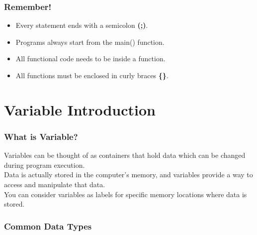 \documentclass[xcolor=dvipsnames]{beamer}
\begin{document}
    \begin{frame}
        \frametitle{Remember!}
        \begin{itemize}
            \item Every statement ends with a semicolon \textbf{(;)}.
            \item Programs always start from the \alert{main()} function.
            \item All functional code needs to be inside a function.
            \item All functions must be enclosed in curly braces \textbf{\{\}}.
        \end{itemize}
    \end{frame}

    \section{Variable Introduction}
    \begin{frame}
        \frametitle{What is Variable?}
        Variables can be thought of as \alert{containers} that hold data which can be changed during program execution.\\
        Data is actually stored in the computer's memory, and variables provide a way to access and manipulate that data.\\
        You can consider variables as \alert{labels} for specific memory locations where data is stored.
    \end{frame}

    \begin{frame}
        \frametitle{Common Data Types}
    \end{frame}
\end{document}
